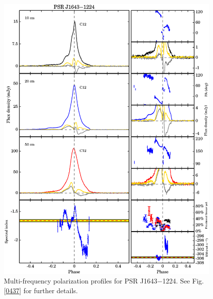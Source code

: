 \documentclass[useAMS,usenatbib]{mn2e}
\begin{document}
\begin{appendices}
\begin{figure}
\begin{center}
\includegraphics[width=6 in]{1643.ps}
\caption{Multi-frequency polarization profiles for PSR J1643$-$1224. 
See Fig. \ref{0437} for further details.}
\label{1643}
\end{center}
\end{figure}


\end{appendices}
\end{document}
